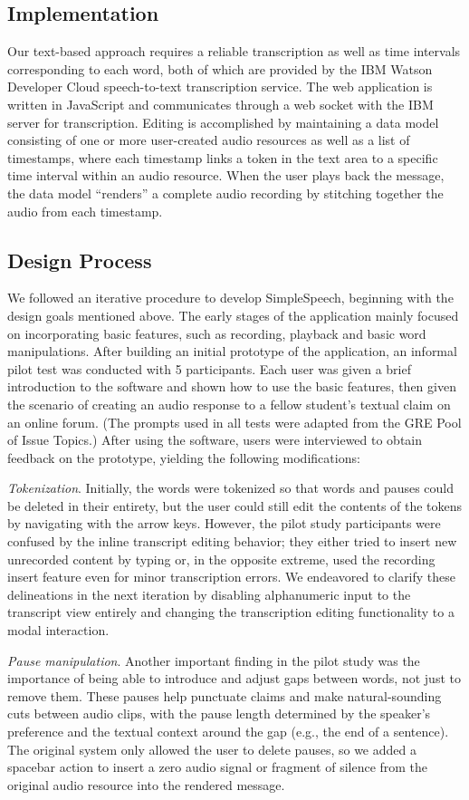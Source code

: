 \subsection{Implementation}
Our text-based approach requires a reliable transcription as well as time intervals corresponding to each word, both of which are provided by the IBM Watson Developer Cloud speech-to-text transcription service.
The web application is written in JavaScript and communicates through a web socket with the IBM server for transcription.
Editing is accomplished by maintaining a data model consisting of one or more user-created audio resources as well as a list of timestamps, where each timestamp links a token in the text area to a specific time interval within an audio resource. 
When the user plays back the message, the data model ``renders'' a complete audio recording by stitching together the audio from each timestamp. 

\subsection{Design Process}
We followed an iterative procedure to develop SimpleSpeech, beginning with the design goals mentioned above.
The early stages of the application mainly focused on incorporating basic features, such as recording, playback and basic word manipulations. 
After building an initial prototype of the application, an informal pilot test was conducted with 5 participants. 
Each user was given a brief introduction to the software and shown how to use the basic features, then given the scenario of creating an audio response to a fellow student's textual claim on an online forum. 
(The prompts used in all tests were adapted from the GRE Pool of Issue Topics.) 
After using the software, users were interviewed to obtain feedback on the prototype, yielding the following modifications:

\emph{Tokenization}. 
Initially, the words were tokenized so that words and pauses could be deleted in their entirety, but the user could still edit the contents of the tokens by navigating with the arrow keys.
However, the pilot study participants were confused by the inline transcript editing behavior; they either tried to insert new unrecorded content by typing or, in the opposite extreme, used the recording insert feature even for minor transcription errors. 
We endeavored to clarify these delineations in the next iteration by disabling alphanumeric input to the transcript view entirely and changing the transcription editing functionality to a modal interaction.

\emph{Pause manipulation}.
Another important finding in the pilot study was the importance of being able to introduce and adjust gaps between words, not just to remove them. 
These pauses help punctuate claims and make natural-sounding cuts between audio clips, with the pause length determined by the speaker's preference and the textual context around the gap (e.g., the end of a sentence). 
The original system only allowed the user to delete pauses, so we added a spacebar action to insert a zero audio signal or fragment of silence from the original audio resource into the rendered message. 
